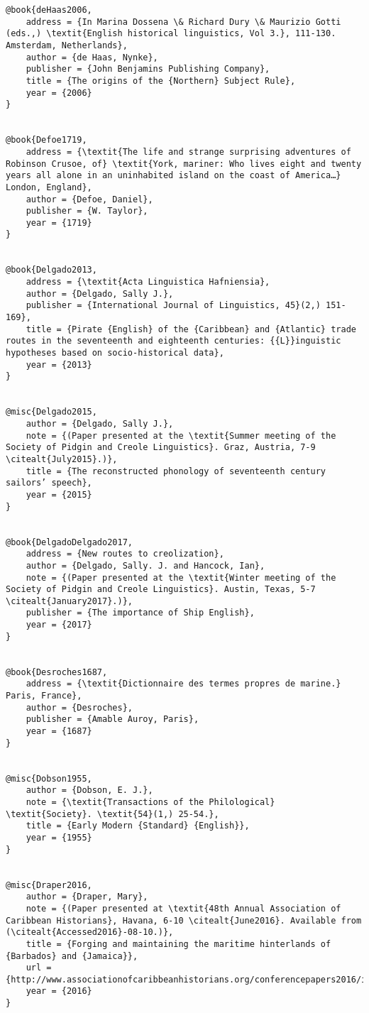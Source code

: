 \begin{verbatim}
@book{deHaas2006,
	address = {In Marina Dossena \& Richard Dury \& Maurizio Gotti (eds.,) \textit{English historical linguistics, Vol 3.}, 111-130. Amsterdam, Netherlands},
	author = {de Haas, Nynke},
	publisher = {John Benjamins Publishing Company},
	title = {The origins of the {Northern} Subject Rule},
	year = {2006}
}


@book{Defoe1719,
	address = {\textit{The life and strange surprising adventures of Robinson Crusoe, of} \textit{York, mariner: Who lives eight and twenty years all alone in an uninhabited island on the coast of America…} London, England},
	author = {Defoe, Daniel},
	publisher = {W. Taylor},
	year = {1719}
}


@book{Delgado2013,
	address = {\textit{Acta Linguistica Hafniensia},
	author = {Delgado, Sally J.},
	publisher = {International Journal of Linguistics, 45}(2,) 151-169},
	title = {Pirate {English} of the {Caribbean} and {Atlantic} trade routes in the seventeenth and eighteenth centuries: {{L}}inguistic hypotheses based on socio-historical data},
	year = {2013}
}


@misc{Delgado2015,
	author = {Delgado, Sally J.},
	note = {(Paper presented at the \textit{Summer meeting of the Society of Pidgin and Creole Linguistics}. Graz, Austria, 7-9 \citealt{July2015}.)},
	title = {The reconstructed phonology of seventeenth century sailors’ speech},
	year = {2015}
}


@book{DelgadoDelgado2017,
	address = {New routes to creolization},
	author = {Delgado, Sally. J. and Hancock, Ian},
	note = {(Paper presented at the \textit{Winter meeting of the Society of Pidgin and Creole Linguistics}. Austin, Texas, 5-7 \citealt{January2017}.)},
	publisher = {The importance of Ship English},
	year = {2017}
}


@book{Desroches1687,
	address = {\textit{Dictionnaire des termes propres de marine.} Paris, France},
	author = {Desroches},
	publisher = {Amable Auroy, Paris},
	year = {1687}
}


@misc{Dobson1955,
	author = {Dobson, E. J.},
	note = {\textit{Transactions of the Philological} \textit{Society}. \textit{54}(1,) 25-54.},
	title = {Early Modern {Standard} {English}},
	year = {1955}
}


@misc{Draper2016,
	author = {Draper, Mary},
	note = {(Paper presented at \textit{48th Annual Association of Caribbean Historians}, Havana, 6-10 \citealt{June2016}. Available from  (\citealt{Accessed2016}-08-10.)},
	title = {Forging and maintaining the maritime hinterlands of {Barbados} and {Jamaica}},
	url = {http://www.associationofcaribbeanhistorians.org/conferencepapers2016/index.htm)},
	year = {2016}
}



\end{verbatim}
